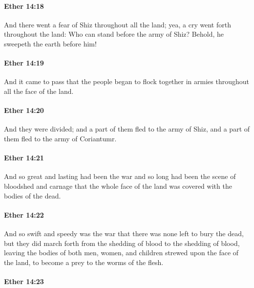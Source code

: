 		\paragraph{Ether 14:18} %
			\label{ETHER-14-18}

			And there went a fear of Shiz throughout all the land;
			yea, a cry went forth throughout the land:
			Who can stand before the army of Shiz?
			Behold, he sweepeth the earth before him!

		\paragraph{Ether 14:19} %
			\label{ETHER-14-19}

			And it came to pass that the people began to flock together in armies
			throughout all the face of the land.

		\paragraph{Ether 14:20} %
			\label{ETHER-14-20}

			And they were divided;
			and a part of them fled to the army of Shiz,
			and a part of them fled to the army of Coriantumr.

		\paragraph{Ether 14:21} %
			\label{ETHER-14-21}

			And so great and lasting had been the war
			and so long had been the scene of bloodshed and carnage
			that the whole face of the land was covered with the bodies of the dead.

		\paragraph{Ether 14:22} %
			\label{ETHER-14-22}

			And so swift and speedy was the war
			that there was none left to bury the dead,
			but they did march forth from the shedding of blood to the shedding of blood,
			leaving the bodies of both men, women, and children
			strewed upon the face of the land,
			to become a prey to the worms of the flesh.

		\paragraph{Ether 14:23} %
			\label{ETHER-14-23}

